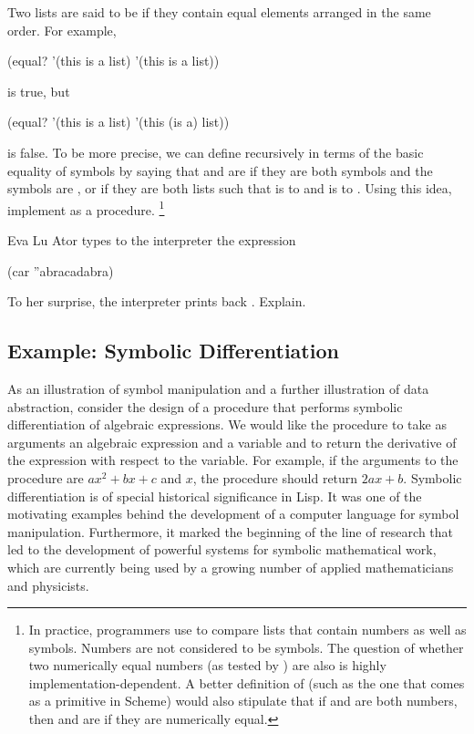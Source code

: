 \begin{exercise}
	\label{Exercise 2.54}
	Two lists are said to be  if they contain equal elements arranged in the same order.
	For example,
	\begin{scheme}
	  (equal? '(this is a list) '(this is a list))
	\end{scheme}
	is true, but
	\begin{scheme}
	  (equal? '(this is a list) '(this (is a) list))
	\end{scheme}
	is false.
	To be more precise, we can define   recursively in terms of the basic  equality of symbols by saying that  and  are  if they are both symbols and the symbols are , or if they are both lists such that  is  to  and  is  to .
	Using this idea, implement  as a procedure.%
	\footnote{
		In practice, programmers use  to compare lists that contain numbers as well as symbols.
		Numbers are not considered to be symbols.
		The question of whether two numerically equal numbers (as tested by \code{=}) are also  is highly implementation-dependent.
		A better definition of  (such as the one that comes as a primitive in Scheme) would also stipulate that if  and  are both numbers, then  and  are  if they are numerically equal.
	}
\end{exercise}



\begin{exercise}
	\label{Exercise 2.55}
	Eva Lu Ator types to the interpreter the expression
	\begin{scheme}
	  (car ''abracadabra)
	\end{scheme}
	To her surprise, the interpreter prints back .
	Explain.
\end{exercise}



\subsection{Example: Symbolic Differentiation}
\label{Section 2.3.2}

As an illustration of symbol manipulation and a further illustration of data abstraction, consider the design of a procedure that performs symbolic differentiation of algebraic expressions.
We would like the procedure to take as arguments an algebraic expression and a variable and to return the derivative of the expression with respect to the variable.
For example, if the arguments to the procedure are \( a x^2 + b x + c \) and \( x \), the procedure should return \( 2a x + b \).
Symbolic differentiation is of special historical significance in Lisp.
It was one of the motivating examples behind the development of a computer language for symbol manipulation.
Furthermore, it marked the beginning of the line of research that led to the development of powerful systems for symbolic mathematical work, which are currently being used by a growing number of applied mathematicians and physicists.

